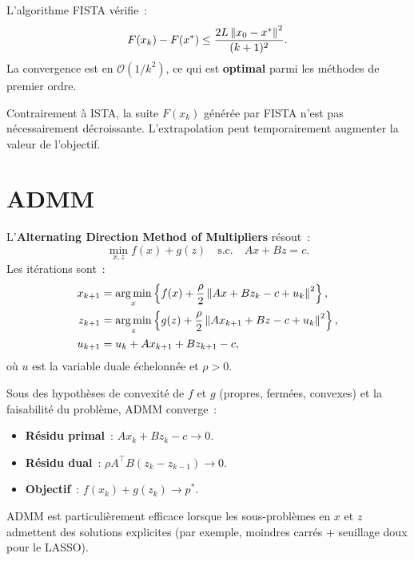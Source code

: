 \begin{theoreme}
L'algorithme FISTA v\'erifie~:
\[
  F(x_k) - F(x^*) \leq \frac{2L \left\| x_0 - x^* \right\|^2}{(k+1)^2}.
\]
La convergence est en $\mathcal{O}(1/k^2)$, ce qui est \textbf{optimal}
parmi les m\'ethodes de premier ordre.
\end{theoreme}

\begin{attention}[title=\textbf{FISTA n'est pas monotone}]
Contrairement \`a ISTA, la suite $F(x_k)$ g\'en\'er\'ee par FISTA n'est pas
n\'ecessairement d\'ecroissante. L'extrapolation peut temporairement augmenter
la valeur de l'objectif.
\end{attention}

\section{ADMM}

\begin{definition}[ADMM]
L'\textbf{Alternating Direction Method of Multipliers} r\'esout~:
\[
  \min_{x, z} f(x) + g(z) \quad \text{s.c.} \quad Ax + Bz = c.
\]
Les it\'erations sont~:
\begin{align*}
  x_{k+1} &= \operatorname*{arg\,min}_x \left\{ f(x) + \frac{\rho}{2}
    \left\| Ax + Bz_k - c + u_k \right\|^2 \right\}, \\
  z_{k+1} &= \operatorname*{arg\,min}_z \left\{ g(z) + \frac{\rho}{2}
    \left\| Ax_{k+1} + Bz - c + u_k \right\|^2 \right\}, \\
  u_{k+1} &= u_k + Ax_{k+1} + Bz_{k+1} - c,
\end{align*}
o\`u $u$ est la variable duale \'echelonn\'ee et $\rho > 0$.
\end{definition}

\begin{theoreme}
Sous des hypoth\`eses de convexit\'e de $f$ et $g$ (propres, ferm\'ees,
convexes) et la faisabilit\'e du probl\`eme, ADMM converge~:
\begin{itemize}
  \item \textbf{R\'esidu primal}~: $Ax_{k} + Bz_k - c \to 0$.
  \item \textbf{R\'esidu dual}~: $\rho A^\top B(z_k - z_{k-1}) \to 0$.
  \item \textbf{Objectif}~: $f(x_k) + g(z_k) \to p^*$.
\end{itemize}
\end{theoreme}

\begin{remarque}
ADMM est particuli\`erement efficace lorsque les sous-probl\`emes en $x$ et
$z$ admettent des solutions explicites (par exemple, moindres carr\'es +
seuillage doux pour le LASSO).
\end{remarque}

